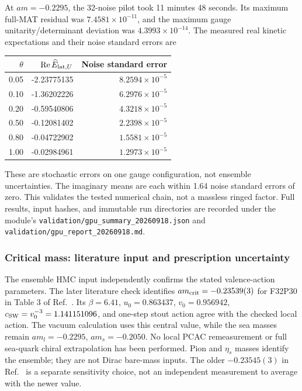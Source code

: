 \documentclass[11pt]{article}
\numberwithin{equation}{section}
\begin{document}
At \(am=-0.2295\), the 32-noise pilot took 11 minutes 48 seconds. Its
maximum full-MAT residual was \(7.4581\times10^{-11}\), and the maximum
gauge unitarity/determinant deviation was \(4.3993\times10^{-14}\).
The measured real kinetic expectations and their noise standard errors are
\begin{center}
\begin{tabular}{rrr}
\toprule
\(\theta\) & \(\operatorname{Re}\widehat E_{{\rm lat},U}\) & Noise standard error \\
\midrule
0.05 & -2.23775135 & \(8.2594\times10^{-5}\) \\
0.10 & -1.36202226 & \(6.2976\times10^{-5}\) \\
0.20 & -0.59540806 & \(4.3218\times10^{-5}\) \\
0.50 & -0.12081402 & \(2.2398\times10^{-5}\) \\
0.80 & -0.04722902 & \(1.5581\times10^{-5}\) \\
1.00 & -0.02984961 & \(1.2973\times10^{-5}\) \\
\bottomrule
\end{tabular}
\end{center}
These are stochastic errors on one gauge configuration, not ensemble
uncertainties. The imaginary means are each within 1.64 noise standard
errors of zero. This validates the tested numerical chain, not a massless
ringed factor. Full results, input hashes, and immutable run directories
are recorded under the module's
\nolinkurl{validation/gpu_summary_20260918.json} and
\nolinkurl{validation/gpu_report_20260918.md}.

\subsubsection{Critical mass: literature input and prescription uncertainty}
\label{sec:ringed-critical-mass}
The ensemble HMC input independently confirms the stated valence-action
parameters. The later literature check identifies
\(am_{\rm crit}=-0.23539(3)\) for F32P30 in Table 3 of
Ref.~\cite{DuEtAl2024CriticalMass}. Its \(\beta=6.41\),
\(u_0=0.863437\), \(v_0=0.956942\),
\(c_{\rm SW}=v_0^{-3}=1.141151096\), and one-step stout action agree
with the checked local action. The vacuum calculation uses this central
value, while the sea masses remain \(am_l=-0.2295\), \(am_s=-0.2050\).
No local PCAC remeasurement or full sea-quark chiral extrapolation has been
performed. Pion and \(\eta_s\) masses identify the ensemble; they are not
Dirac bare-mass inputs. The older \(-0.23545(3)\) in
Ref.~\cite{HuEtAl2023CriticalMass} is a separate sensitivity choice, not an
independent measurement to average with the newer value.
\end{document}
